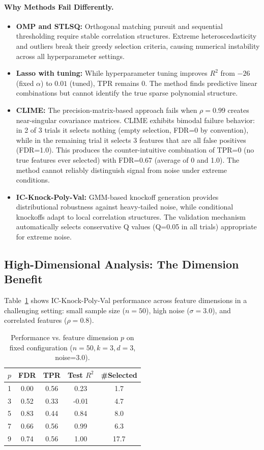 \paragraph{Why Methods Fail Differently.}
\begin{itemize}
    \item \textbf{OMP and STLSQ:} Orthogonal matching pursuit and sequential thresholding require stable correlation structures. Extreme heteroscedasticity and outliers break their greedy selection criteria, causing numerical instability across all hyperparameter settings.
    \item \textbf{Lasso with tuning:} While hyperparameter tuning improves $R^2$ from $-26$ (fixed $\alpha$) to $0.01$ (tuned), TPR remains 0. The method finds predictive linear combinations but cannot identify the true sparse polynomial structure.
    \item \textbf{CLIME:} The precision-matrix-based approach fails when $\rho=0.99$ creates near-singular covariance matrices. CLIME exhibits bimodal failure behavior: in 2 of 3 trials it selects nothing (empty selection, FDR=0 by convention), while in the remaining trial it selects 3 features that are all false positives (FDR=1.0). This produces the counter-intuitive combination of TPR=0 (no true features ever selected) with FDR=0.67 (average of 0 and 1.0). The method cannot reliably distinguish signal from noise under extreme conditions.
    \item \textbf{IC-Knock-Poly-Val:} GMM-based knockoff generation provides distributional robustness against heavy-tailed noise, while conditional knockoffs adapt to local correlation structures. The validation mechanism automatically selects conservative Q values (Q=0.05 in all trials) appropriate for extreme noise.
\end{itemize}

\subsection{High-Dimensional Analysis: The Dimension Benefit}
\label{subsec:high-dim}

Table~\ref{tab:varying-p} shows IC-Knock-Poly-Val performance across feature dimensions in a challenging setting: small sample size ($n=50$), high noise ($\sigma=3.0$), and correlated features ($\rho=0.8$).

\begin{table}[htbp]
\centering
\caption{Performance vs. feature dimension $p$ on fixed configuration ($n=50, k=3, d=3$, noise=3.0).}
\label{tab:varying-p}
\small
\begin{tabular}{lcccc}
\toprule
$p$ & \textbf{FDR} & \textbf{TPR} & \textbf{Test $R^2$} & \textbf{\#Selected} \\
\midrule
1 & 0.00 & 0.56 & 0.23 & 1.7 \\
3 & 0.52 & 0.33 & -0.01 & 4.7 \\
5 & 0.83 & 0.44 & 0.84 & 8.0 \\
7 & 0.66 & 0.56 & 0.99 & 6.3 \\
9 & 0.74 & 0.56 & 1.00 & 17.7 \\
\bottomrule
\end{tabular}
\end{table}

